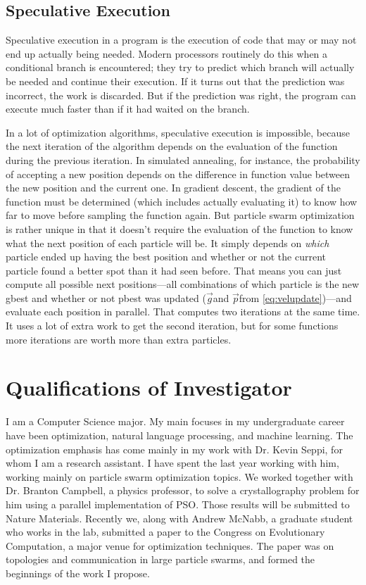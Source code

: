 \documentclass[onecolumn, 12pt]{article}
\providecommand{\gbest}{\ensuremath{\Vec{g}}}
\providecommand{\pbest}{\ensuremath{\Vec{p}}}
\begin{document}
\subsection{Speculative Execution}

Speculative execution in a program is the execution of code that may or may not
end up actually being needed.  Modern processors routinely do this when a
conditional branch is encountered; they try to predict which branch will
actually be needed and continue their execution.  If it turns out that the
prediction was incorrect, the work is discarded.  But if the prediction was
right, the program can execute much faster than if it had waited on the branch.  

In a lot of optimization algorithms, speculative execution is impossible,
because the next iteration of the algorithm depends on the evaluation of the
function during the previous iteration.  In simulated annealing, for instance,
the probability of accepting a new position depends on the difference in
function value between the new position and the current one.  In gradient
descent, the gradient of the function must be determined (which includes
actually evaluating it) to know how far to move before sampling the function
again.  But particle swarm optimization is rather unique in that it doesn't
require the evaluation of the function to know what the next position of each
particle will be.  It simply depends on \emph{which} particle ended up having
the best position and whether or not the current particle found a better spot
than it had seen before.  That means you can just compute all possible next
positions---all combinations of which particle is the new gbest and whether or
not pbest was updated (\gbest and \pbest from \eqref{eq:velupdate})---and
evaluate each position in parallel.  That computes two iterations at the same
time.  It uses a lot of extra work to get the second iteration, but for some
functions more iterations are worth more than extra particles.

\section{Qualifications of Investigator}

I am a Computer Science major.  My main focuses in my undergraduate career have
been optimization, natural language processing, and machine learning.  The
optimization emphasis has come mainly in my work with Dr. Kevin Seppi, for whom
I am a research assistant.  I have spent the last year working with him,
working mainly on particle swarm optimization topics.  We worked together with
Dr. Branton Campbell, a physics professor, to solve a crystallography problem
for him using a parallel implementation of PSO.  Those results will be
submitted to Nature Materials.  Recently we, along with Andrew McNabb, a
graduate student who works in the lab, submitted a paper to the Congress on
Evolutionary Computation, a major venue for optimization techniques.  The paper
was on topologies and communication in large particle swarms, and formed the
beginnings of the work I propose.
\end{document}
